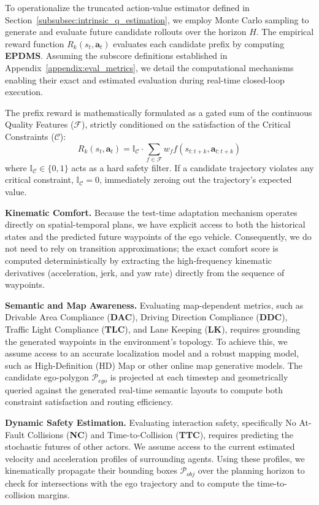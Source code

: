 \documentclass{article}
\begin{document}
To operationalize the truncated action-value estimator defined in Section~\ref{subsubsec:intrinsic_q_estimation}, we employ Monte Carlo sampling to generate and evaluate future candidate rollouts over the horizon $H$. The empirical reward function $R_k(s_t, \mathbf{a}_t)$ evaluates each candidate prefix by computing \textbf{EPDMS}. Assuming the subscore definitions established in Appendix~\ref{appendix:eval_metrics}, we detail the computational mechanisms enabling their exact and estimated evaluation during real-time closed-loop execution. 

The prefix reward is mathematically formulated as a gated sum of the continuous Quality Features ($\mathcal{F}$), strictly conditioned on the satisfaction of the Critical Constraints ($\mathcal{C}$):
\begin{equation}
    R_k(s_t, \mathbf{a}_t) = \mathbb{I}_{\mathcal{C}} \cdot \sum_{f \in \mathcal{F}} w_f f(s_{t:t+k}, \mathbf{a}_{t:t+k})
\end{equation}
where $\mathbb{I}_{\mathcal{C}} \in \{0, 1\}$ acts as a hard safety filter. If a candidate trajectory violates any critical constraint, $\mathbb{I}_{\mathcal{C}} = 0$, immediately zeroing out the trajectory's expected value.

\textbf{Kinematic Comfort.} Because the test-time adaptation mechanism operates directly on spatial-temporal plans, we have explicit access to both the historical states and the predicted future waypoints of the ego vehicle. Consequently, we do not need to rely on transition approximations; the exact comfort score is computed deterministically by extracting the high-frequency kinematic derivatives (acceleration, jerk, and yaw rate) directly from the sequence of waypoints.

\textbf{Semantic and Map Awareness.} Evaluating map-dependent metrics, such as Drivable Area Compliance (\textbf{DAC}), Driving Direction Compliance (\textbf{DDC}), Traffic Light Compliance (\textbf{TLC}), and Lane Keeping (\textbf{LK}), requires grounding the generated waypoints in the environment's topology. To achieve this, we assume access to an accurate localization model and a robust mapping model, such as High-Definition (HD) Map or other online map generative models. The candidate ego-polygon $\mathcal{P}_{ego}$ is projected at each timestep and geometrically queried against the generated real-time semantic layouts to compute both constraint satisfaction and routing efficiency.

\textbf{Dynamic Safety Estimation.} Evaluating interaction safety, specifically No At-Fault Collisions (\textbf{NC}) and Time-to-Collision (\textbf{TTC}), requires predicting the stochastic futures of other actors. We assume access to the current estimated velocity and acceleration profiles of surrounding agents. Using these profiles, we kinematically propagate their bounding boxes $\mathcal{P}_{obj}$ over the planning horizon to check for intersections with the ego trajectory and to compute the time-to-collision margins.
\end{document}
